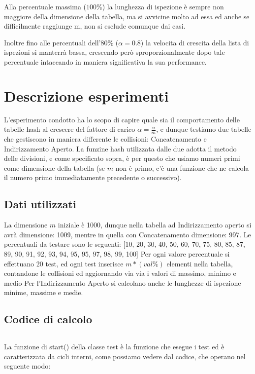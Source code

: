 \documentclass{article}
\begin{document}
Alla percentuale massima ($100\%$) la lunghezza di ispezione è sempre non maggiore della dimensione della tabella, ma si avvicine molto ad essa ed anche se difficilmente raggiunge m, non si esclude comunque dai casi. 

Inoltre fino alle percentuali dell'$80\%$ ($\alpha=0.8$) la velocita di crescita della lista di ispezioni si manterrà bassa, crescendo però sproporzionalmente dopo tale percentuale intaccando in maniera significativa la sua performance.


\section{Descrizione esperimenti}
L'esperimento condotto ha lo scopo di capire quale sia il comportamento delle tabelle hash al crescere del fattore di carico $\alpha=\frac{n}{m}$, e dunque testiamo due tabelle che gestiscono in maniera differente le collisioni: Concatenamento e Indirizzamento Aperto.
La funzine hash utilizzata dalle due adotta il metodo delle divisioni, e come specificato sopra, è per questo che usiamo numeri primi come dimensione della tabella (se $m$ non è primo, c'è una funzione che ne calcola il numero primo immediatamente precedente o successivo).
\subsection{Dati utilizzati}
La dimensione $m$ iniziale è 1000, dunque nella tabella ad Indirizzamento aperto si avrà dimensione: 1009, mentre in quella con Concatenamento dimensione: 997.
Le percentuali da testare sono le seguenti:
[10, 20, 30, 40, 50, 60, 70, 75, 80, 85, 87, 89, 90, 91, 92, 93, 94, 95, 95, 97, 98, 99, 100]
Per ogni valore percentuale si effettuano 20 test, ed ogni test inserisce $m*(val\%)$ elementi nella tabella, contandone le collisioni ed aggiornando via via i valori di massimo, minimo e medio
Per l'Indirizzamento Aperto si calcolano anche le lunghezze di ispezione minime, massime e medie.

\newpage

\subsection{Codice di calcolo}

\inputminted{python}{python.py}

La funzione di start() della classe test è la funzione che esegue i test ed è caratterizzata da cicli interni, come possiamo vedere dal codice, che operano nel seguente modo:
\end{document}
